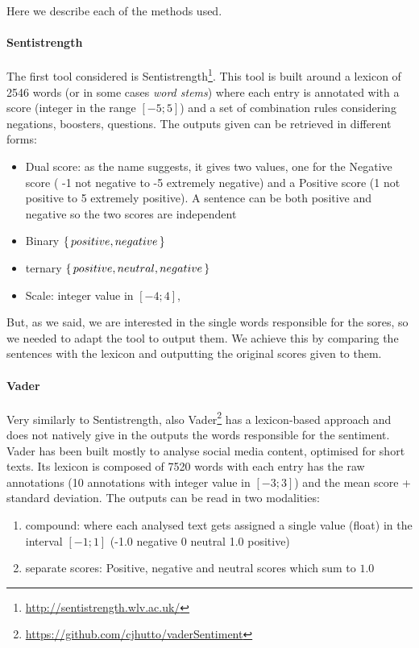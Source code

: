 Here we describe each of the methods used.

\paragraph{Sentistrength}
The first tool considered is Sentistrength\footnote{\url{http://sentistrength.wlv.ac.uk/}}. This tool is built around a lexicon of 2546 words (or in some cases \emph{word stems}) where each entry is annotated with a score (integer in the range $[-5;5]$) and a set of combination rules considering negations, boosters, questions. The outputs given can be retrieved in different forms:
\begin{itemize}
    \item Dual score: as the name suggests, it gives two values, one for the Negative score ( -1 not negative to -5 extremely negative) and a Positive score (1 not positive to 5 extremely positive). A sentence can be both positive and negative so the two scores are independent
    \item Binary $\set{positive, negative}$
    \item ternary $\set{positive, neutral, negative}$
    \item Scale: integer value in $[-4;4]$,
\end{itemize}

But, as we said, we are interested in the single words responsible for the sores, so we needed to adapt the tool to output them. We achieve this by comparing the sentences with the lexicon and outputting the original scores given to them.


\paragraph{Vader}
Very similarly to Sentistrength, also Vader\footnote{\url{https://github.com/cjhutto/vaderSentiment}} has a lexicon-based approach and does not natively give in the outputs the words responsible for the sentiment. Vader has been built mostly to analyse social media content, optimised for short texts.
Its lexicon is composed of 7520 words with each entry has the raw annotations (10 annotations with integer value in $[-3;3]$) and the mean score + standard deviation.
The outputs can be read in two modalities:
\begin{enumerate}
    \item compound: where each analysed text gets assigned a single value (float) in the interval $[-1;1]$ (-1.0 negative 0 neutral 1.0 positive)
    \item separate scores: Positive, negative and neutral scores which sum to $1.0$
\end{enumerate}

